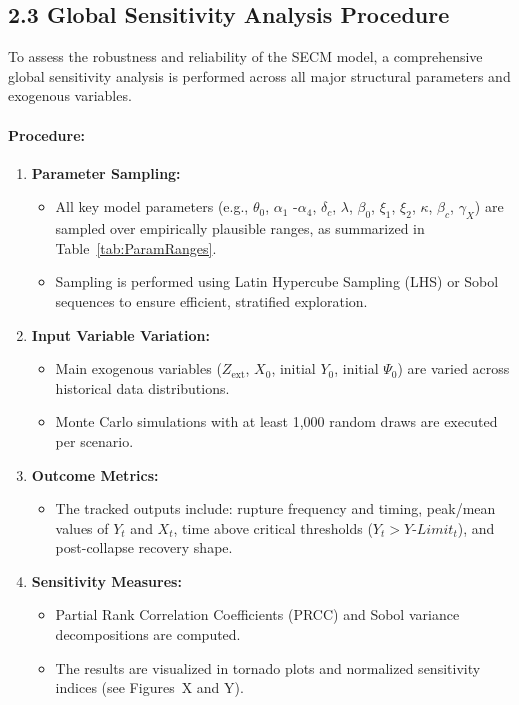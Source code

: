 \documentclass[12pt]{report}
\begin{document}
\subsection{2.3 Global Sensitivity Analysis Procedure}

To assess the robustness and reliability of the SECM model, a comprehensive global sensitivity analysis is performed across all major structural parameters and exogenous variables.

\paragraph{Procedure:}
\begin{enumerate}
  \item \textbf{Parameter Sampling:}
  \begin{itemize}
    \item All key model parameters (e.g., $\theta_0$, $\alpha_1$ -$\alpha_4$, $\delta_c$, $\lambda$, $\beta_0$, $\xi_1$, $\xi_2$, $\kappa$, $\beta_c$, $\gamma_X$) are sampled over empirically plausible ranges, as summarized in Table~\ref{tab:ParamRanges}.
    \item Sampling is performed using Latin Hypercube Sampling (LHS) or Sobol sequences to ensure efficient, stratified exploration.
  \end{itemize}
  
  \item \textbf{Input Variable Variation:}
  \begin{itemize}
    \item Main exogenous variables ($Z_{\text{ext}}$, $X_0$, initial $Y_0$, initial $\Psi_0$) are varied across historical data distributions.
    \item Monte Carlo simulations with at least 1,000 random draws are executed per scenario.
  \end{itemize}

  \item \textbf{Outcome Metrics:}
  \begin{itemize}
    \item The tracked outputs include: rupture frequency and timing, peak/mean values of $Y_t$ and $X_t$, time above critical thresholds ($Y_t > Y\text{-}Limit_t$), and post-collapse recovery shape.
  \end{itemize}

  \item \textbf{Sensitivity Measures:}
  \begin{itemize}
    \item Partial Rank Correlation Coefficients (PRCC) and Sobol variance decompositions are computed.
    \item The results are visualized in tornado plots and normalized sensitivity indices (see Figures~X and Y).
  \end{itemize}


\end{enumerate}
\end{document}

